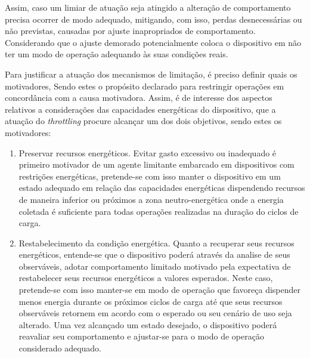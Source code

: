 Assim, caso um limiar de atuação seja atingido a alteração de comportamento precisa ocorrer de modo adequado, mitigando, com isso, perdas desnecessárias ou não previstas, causadas por ajuste inapropriados de comportamento. Considerando que o ajuste demorado potencialmente coloca o dispositivo em não ter um modo de operação adequando às suas condições reais.


Para justificar a atuação dos mecanismos de limitação, é preciso definir quais os motivadores, Sendo estes o propósito declarado para restringir operações em concordância com a causa motivadora. Assim, é de interesse dos aspectos relativos a considerações das capacidades energéticas do dispositivo, que a atuação do \textit{throttling} procure alcançar um dos dois objetivos, sendo estes os motivadores:

\begin{enumerate}
	\item Preservar recursos energéticos. 
	Evitar gasto excessivo ou inadequado é primeiro motivador de um agente limitante embarcado em dispositivos com restrições energéticas, pretende-se com isso manter o dispositivo em um estado adequado em relação das capacidades energéticas dispendendo recursos de maneira inferior ou próximos a zona neutro-energética onde a energia coletada é suficiente para todas operações realizadas na duração do ciclos de carga.
	
	\item Restabelecimento da condição energética.
	Quanto a recuperar seus recursos energéticos, entende-se que o dispositivo poderá através da analise de seus observáveis, adotar comportamento limitado motivado pela expectativa de restabelecer seus recursos energéticos a valores esperados. Neste caso, pretende-se com isso manter-se em modo de operação que favoreça dispender menos energia durante os próximos ciclos de carga até que seus recursos observáveis retornem em acordo com o esperado ou seu cenário de uso seja alterado. Uma vez alcançado um estado desejado, o dispositivo poderá reavaliar seu comportamento e ajustar-se para o modo de operação considerado adequado. 
\end{enumerate}





